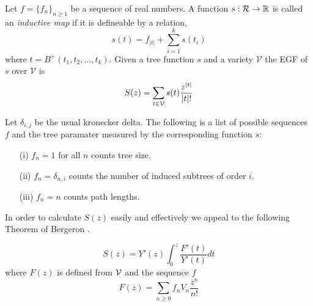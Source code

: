 \begin{defn}
Let $f = \{f_n\}_{n\geq 1}$ be a sequence of real numbers.  A function $s: \operatorname{\mathcal{R}} \rightarrow \mathbb{R}$ is called an 
\emph{inductive map} if it is defineable by a relation,
\[
 s(t) = f_{\lvert t \rvert} + \sum_{i=1}^k s(t_i)
\]
where $t = B^{+}(t_1,t_2,\dots,t_k)$.  Given a tree function $s$ and a variety $\mathcal{V}$ the EGF of $s$ over $\mathcal{V}$ is 
\[
 S(z) = \sum_{t \in \operatorname{\mathcal{V}}} s(t) \frac{z^{\lvert t \rvert}}{\lvert t \rvert !}
\]
\begin{ex}
 Let $\delta_{i,j}$ be the usual kronecker delta. The following is a list of possible sequences $f$ and the tree paramater 
 measured by the corresponding function $s$:
 \begin{itemize}
  \item[(i)]   $f_n = 1$ for all $n$ counts tree size.
  \item[(ii)] $f_n = \delta_{n,i}$ counts the number of induced subtrees of order $i$.
  \item[(iii)] $f_n = n$ counts path lengths.
 \end{itemize}
 \end{ex}

In order to calculate $S(z)$ easily and effectively we appeal to the following Theorem of Bergeron \cite{Bergeron}.
\begin{thm}
 \[
 S(z) = Y'(z) \int_{0}^{z} \frac{F'(t)}{Y'(t)} dt
 \]
where $F(z)$ is defined from $\operatorname{\mathcal{V}}$ and the sequence $f$
\[
 F(z) = \sum_{n \geq 0} f_n V_n \frac{z^n}{n!}
\]
\end{thm}

 


\end{defn}












